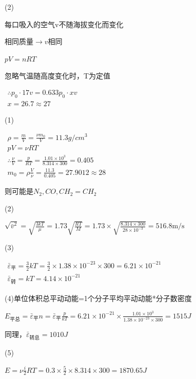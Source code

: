 \documentclass[b5paper,opensource]{./template/qyxf-book}
\begin{document}
(2)

每口吸入的空气v不随海拔变化而变化

相同质量$\rightarrow v $相同

$pV=nRT$

忽略气温随高度变化时，T为定值

$
\begin{array} { l } { \therefore p _ { 0 } \cdot 17 v = 0.633 p _ { 0 } \cdot x v } \\ { x = 26.7 \approx 27 } \end{array}
$


\solve

(1)

$
\begin{array} { c } { \rho = \frac { m } { V } = \frac { \nu m _ { 0 } } { V } = 11.3 g / c m ^ { 3 } } \\ { p V = \nu R T } \\ { \therefore \frac { \nu } { V } = \frac { p } { R T } = \frac { 1.01 \times 10 ^ { 3 } } { 8.314 \times 300 } = 0.405 } \\ { m _ { 0 } = \rho \frac { V } { \nu } = \frac { 11.3 } { 0.405 } = 27.9012 \approx 28 } \end{array}
$

则可能是$N_2,CO,CH_2=CH_2$

(2)

$
\sqrt { \bar { v } ^ { 2 } } = \sqrt { \frac { 3 k T } { \mu } } = 1.73 \sqrt { \frac { R T } { M } } = 1.73 \times \sqrt { \frac { 8.314 \times 300 } { 28 \times 10 ^ { - 3 } } } = 516.8 \mathrm { m } / \mathrm { s }
$

(3)

$
\begin{array} { c } { \bar { \varepsilon } _ {\mbox{平}} = \frac { 3 } { 2 } k T = \frac { 3 } { 2 } \times 1.38 \times 10 ^ { - 23 } \times 300 = 6.21 \times 10 ^ { - 21 } } \\ { \bar { \varepsilon } _ { \mbox{转}} = k T = 4.14 \times 10 ^ { - 21 } } \end{array}
$

(4)单位体积总平动动能=1个分子平均平动动能*分子数密度

$E_{\mbox{平总}}=\bar { \varepsilon } _ {\mbox{平}}n=\bar { \varepsilon } _ {\mbox{平}}\frac{p}{kT}=6.21 \times 10 ^ { - 21 } \times \frac { 1.01 \times 10 ^ { 3 } } { 1.38 \times 10 ^ { - 23 } \times 300 } = 1515 J$

同理，$\bar { \varepsilon } _ {\mbox{转总}}=1010J$

(5)

$
E = \nu \frac { i } { 2 } R T = 0.3 \times \frac { 5 } { 2 } \times 8.314 \times 300 = 1870.65 J
$
\end{document}
